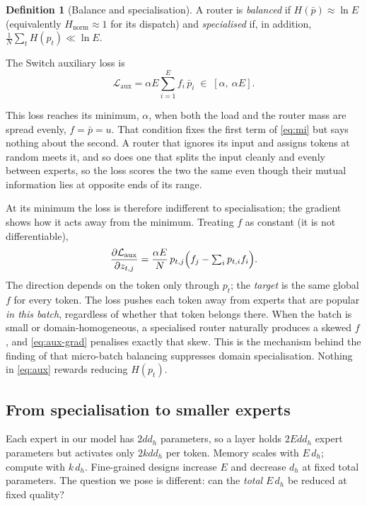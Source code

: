 \documentclass[10pt]{article}
\theoremstyle{definition}
\newtheorem{definition}{Definition}
\theoremstyle{remark}
\newcommand{\Laux}{\mathcal{L}_{\mathrm{aux}}}
\newcommand{\Hn}{H_{\mathrm{norm}}}
\begin{document}
\begin{definition}[Balance and specialisation]
A router is \emph{balanced} if $H(\bar p)\approx \ln E$ (equivalently $\Hn\approx 1$ for its dispatch) and \emph{specialised} if, in addition, $\frac1N\sum_t H(p_t)\ll\ln E$.
\end{definition}

The Switch auxiliary loss is
\begin{equation}
  \Laux = \alpha E \sum_{i=1}^E f_i\,\bar p_i \;\in\; [\alpha,\ \alpha E].
  \label{eq:aux}
\end{equation}

This loss reaches its minimum, $\alpha$, when both the load and the router mass are spread evenly, $f=\bar p=u$. That condition fixes the first term of \eqref{eq:mi} but says nothing about the second. A router that ignores its input and assigns tokens at random meets it, and so does one that splits the input cleanly and evenly between experts, so the loss scores the two the same even though their mutual information lies at opposite ends of its range.

At its minimum the loss is therefore indifferent to specialisation; the gradient shows how it acts away from the minimum. Treating $f$ as constant (it is not differentiable),
\begin{equation}
  \frac{\partial \Laux}{\partial z_{t,j}} = \frac{\alpha E}{N}\, p_{t,j}\Bigl(f_j - \textstyle\sum_i p_{t,i} f_i\Bigr).
  \label{eq:aux-grad}
\end{equation}
The direction depends on the token only through $p_t$; the \emph{target} is the same global $f$ for every token. The loss pushes each token away from experts that are popular \emph{in this batch}, regardless of whether that token belongs there. When the batch is small or domain-homogeneous, a specialised router naturally produces a skewed $f$, and \eqref{eq:aux-grad} penalises exactly that skew. This is the mechanism behind the finding of \citet{qiu2025demons} that micro-batch balancing suppresses domain specialisation. Nothing in \eqref{eq:aux} rewards reducing $H(p_t)$.

\subsection{From specialisation to smaller experts}

Each expert in our model has $2dd_h$ parameters, so a layer holds $2Edd_h$ expert parameters but activates only $2kdd_h$ per token. Memory scales with $E\,d_h$; compute with $k\,d_h$. Fine-grained designs \citep{dai2024deepseekmoe,krajewski2024scaling,he2024million} increase $E$ and decrease $d_h$ at fixed total parameters. The question we pose is different: can the \emph{total} $E\,d_h$ be reduced at fixed quality?
\end{document}
